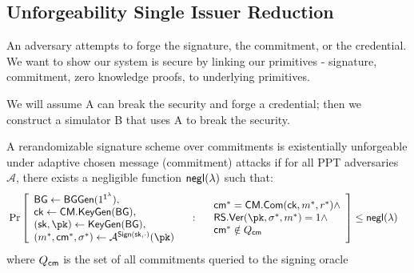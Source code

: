 \subsection{Unforgeability Single Issuer Reduction}
An adversary attempts to forge the signature, the commitment, or the credential. 
We want to show our system is secure by linking our primitives - signature, commitment, zero knowledge proofs, to underlying primitives.

We will assume A can break the security and forge a credential; then we construct a simulator B that uses A to break the security. 


\begin{definition}
A rerandomizable signature scheme over commitments is existentially unforgeable under adaptive chosen message (commitment) attacks if for all PPT adversaries $\mathcal{A}$, there exists a negligible function ${\mathsf{negl}(\lambda)}$ such that:
    \begin{align*}
        &\Pr\left[
            \begin{array}{l}
                \mathsf{BG} \gets \mathsf{BGGen}(1^{\secparam}), \\
                \mathsf{ck} \gets \mathsf{CM.KeyGen}(\mathsf{BG}), \\
                (\sk, \pk) \gets \mathsf{KeyGen}(\mathsf{BG}), \\
                (m^*, \cm^*, \sigma^*) \gets \mathcal{A}^{\mathsf{Sign}(\sk, \cdot)}(\pk) \\
                \end{array}
                \quad : \quad
                \begin{array}{l}
                \cm^* = \mathsf{CM.Com}(\mathsf{ck}, m^*, r^*) \land \\
                \mathsf{RS.Ver}(\pk, \sigma^*, m^*) = 1 \land \\
                \cm^* \notin Q_{\cm}
            \end{array}
        \right] \leq \negl
    \end{align*}
where $Q_{\mathsf{cm}}$ is the set of all commitments queried to the signing oracle
\end{definition}

